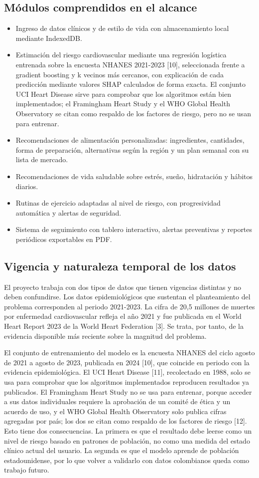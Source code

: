 \documentclass[conference]{IEEEtran}
\begin{document}
\subsection{Módulos comprendidos en el alcance}
\begin{itemize}
\item Ingreso de datos clínicos y de estilo de vida con almacenamiento local mediante IndexedDB.
\item Estimación del riesgo cardiovascular mediante una regresión logística entrenada sobre la encuesta NHANES 2021-2023 [10], seleccionada frente a gradient boosting y k vecinos más cercanos, con explicación de cada predicción mediante valores SHAP calculados de forma exacta. El conjunto UCI Heart Disease sirve para comprobar que los algoritmos están bien implementados; el Framingham Heart Study y el WHO Global Health Observatory se citan como respaldo de los factores de riesgo, pero no se usan para entrenar.
\item Recomendaciones de alimentación personalizadas: ingredientes, cantidades, forma de preparación, alternativas según la región y un plan semanal con su lista de mercado.
\item Recomendaciones de vida saludable sobre estrés, sueño, hidratación y hábitos diarios.
\item Rutinas de ejercicio adaptadas al nivel de riesgo, con progresividad automática y alertas de seguridad.
\item Sistema de seguimiento con tablero interactivo, alertas preventivas y reportes periódicos exportables en PDF.
\end{itemize}
\subsection{Vigencia y naturaleza temporal de los datos}
El proyecto trabaja con dos tipos de datos que tienen vigencias distintas y no deben confundirse. Los datos epidemiológicos que sustentan el planteamiento del problema corresponden al periodo 2021-2023. La cifra de 20{,}5 millones de muertes por enfermedad cardiovascular refleja el año 2021 y fue publicada en el World Heart Report 2023 de la World Heart Federation [3]. Se trata, por tanto, de la evidencia disponible más reciente sobre la magnitud del problema.

El conjunto de entrenamiento del modelo es la encuesta NHANES del ciclo agosto de 2021 a agosto de 2023, publicada en 2024 [10], que coincide en periodo con la evidencia epidemiológica. El UCI Heart Disease [11], recolectado en 1988, solo se usa para comprobar que los algoritmos implementados reproducen resultados ya publicados. El Framingham Heart Study no se usa para entrenar, porque acceder a sus datos individuales requiere la aprobación de un comité de ética y un acuerdo de uso, y el WHO Global Health Observatory solo publica cifras agregadas por país; los dos se citan como respaldo de los factores de riesgo [12]. Esto tiene dos consecuencias. La primera es que el resultado debe leerse como un nivel de riesgo basado en patrones de población, no como una medida del estado clínico actual del usuario. La segunda es que el modelo aprende de población estadounidense, por lo que volver a validarlo con datos colombianos queda como trabajo futuro.
\end{document}

